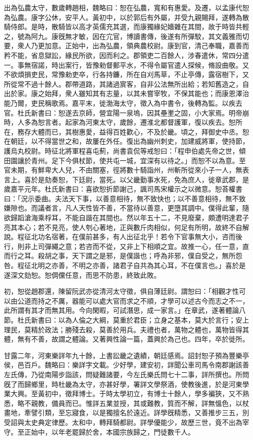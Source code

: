 \begin{pinyinscope}
出為弘農太守，數歲轉趙相，魏略曰：恕在弘農，寬和有惠愛。及遷，以孟康代恕為弘農。康字公休，安平人。黃初中，以於郭后有外屬，并受九親賜拜，遂轉為散騎侍郎。是時，散騎皆以高才英儒充其選，而康獨緣妃嬙雜在其間，故于時皆共輕之，號為阿九。康旣無才敏，因在宂官，博讀書傳，後遂有所彈駮，其文義雅而切要，衆人乃更加意。正始中，出為弘農，領典農校尉。康到官，清己奉職，嘉善而矜不能，省息獄訟，緣民所欲，因而利之。郡領吏二百餘人，涉春遣休，常四分遣一。事無宿諾，時出案行，皆豫勑督郵平水，不得令屬官遣人探候，脩設曲敬。又不欲煩損吏民，常豫勑吏卒，行各持鐮，所在自刈馬草，不止亭傳，露宿樹下，又所從常不過十餘人。郡帶道路，其諸過賔客，自非公法無所出給；若知舊造之，自出於家。康之始拜，衆人雖知其有志量，以其未嘗宰牧，不保其能也；而康恩澤治能乃爾，吏民稱歌焉。嘉平末，徙渤海太守，徵入為中書令，後轉為監。以疾去官。杜氏新書曰：恕遂去京師，營宜陽一泉塢，因其壘壍之固，小大家焉。明帝崩時，人多為恕言者。起家為河東太守，歲餘，遷淮北都督護軍，復以疾去。恕所在，務存大體而已，其樹惠愛，益得百姓歡心，不及於畿。頃之，拜御史中丞。恕在朝廷，以不得當世之和，故屢在外任。復出為幽州刺史，加建威將軍，使持節，護烏丸校尉。時征北將軍程喜屯薊，尚書袁侃等戒恕曰：「程申伯處先帝之世，傾田園讓於青州。足下今俱杖節，使共屯一城，宜深有以待之。」而恕不以為意。至官未期，有鮮卑大人兒，不由關塞，徑將數十騎詣州，州斬所從來小子一人，無表言上。喜於是劾奏恕，下廷尉，當死。以父畿勤事水死，免為庶人，徙章武郡，是歲嘉平元年。杜氏新書曰：喜欲恕折節謝己，諷司馬宋權示之以微意。恕荅權書曰：「況示委曲。夫法天下事，以善意相待，無不致快也；以不善意相待，無不致嫌隙也。而議者言，凡人天性皆不善，不當待以善意，更墮其調中。僕得此輩，隨欲歸蹈滄海乘桴耳，不能自諧在其間也。然以年五十二，不見廢棄，頗遭明達君子亮其本心；若不見亮，使人刳心著地，正與數斤肉相似，何足有所明，故終不自解說。程征北功名宿著，在僕前甚多，有人出征北乎！若令下官事無大小，咨而後行，則非上司彈繩之意；若咨而不從，又非上下相順之宜。故推一心，任一意，直而行之耳。殺胡之事，天下謂之是邪，是僕諧也；呼為非邪，僕自受之，無所怨咎。程征北明之亦善，不明之亦善，諸君子自共為其心耳，不在僕言也。」喜於是遂深文劾恕。恕倜儻任意，而思不防患，終致此敗。

初，恕從趙郡還，陳留阮武亦從清河太守徵，俱自薄廷尉。謂恕曰：「相觀才性可以由公道而持之不厲，器能可以處大官而求之不順，才學可以述古今而志之不一，此所謂有其才而無其用。今向閑暇，可試潛思，成一家言。」在章武，遂著體論八節。杜氏新書曰：以為人倫之大綱，莫重於君臣；立身之基本，莫大於言行；安上理民，莫精於政法；勝殘去殺，莫善於用兵。夫禮也者，萬物之體也，萬物皆得其體，無有不善，故謂之體論。又著興性論一篇，蓋興於為己也。四年，卒於徙所。

甘露二年，河東樂詳年九十餘，上書訟畿之遺績，朝廷感焉。詔封恕子預為豐樂亭侯，邑百戶。魏略曰：樂詳字文載。少好學，建安初，詳聞公車司馬令南郡謝該善左氏傳，乃從南陽步詣該，問疑難諸要，今左氏樂氏問七十二事，詳所撰也。所問旣了而歸鄉里，時杜畿為太守，亦甚好學，署詳文學祭酒，使教後進，於是河東學業大興。至黃初中，徵拜博士。于時太學初立，有博士十餘人，學多褊狹，又不熟悉，略不親教，備員而已。惟詳五業並授，其或難教，質而不解，詳無慍色，以杖畫地，牽譬引類，至忘寢食，以是獨擅名於遠近。詳學旣精悉，又善推步三五，別受詔與太史典定律歷。太和中，轉拜騎都尉。詳學優能少，故歷三世，竟不出為宰守。至正始中，以年老罷歸於舍，本國宗族歸之，門徒數千人。


\end{pinyinscope}
